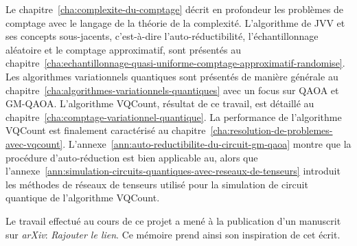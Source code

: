
Le chapitre~\ref{cha:complexite-du-comptage} décrit en profondeur les problèmes de comptage avec le langage de la théorie de la complexité. L'algorithme de JVV et ses concepts sous-jacents, c'est-à-dire l'auto-réductibilité, l'échantillonnage aléatoire et le comptage approximatif, sont présentés au chapitre~\ref{cha:echantillonnage-quasi-uniforme-comptage-approximatif-randomise}. Les algorithmes variationnels quantiques sont présentés de manière générale au chapitre~\ref{cha:algorithmes-variationnels-quantiques} avec un focus sur QAOA et GM-QAOA. L'algorithme VQCount, résultat de ce travail, est détaillé au chapitre~\ref{cha:comptage-variationnel-quantique}. La performance de l'algorithme VQCount est finalement caractérisé au chapitre~\ref{cha:resolution-de-problemes-avec-vqcount}. L'annexe~\ref{ann:auto-reductibilite-du-circuit-gm-qaoa} montre que la procédure d'auto-réduction est bien applicable au, alors que l'annexe~\ref{ann:simulation-circuits-quantiques-avec-reseaux-de-tenseurs} introduit les méthodes de réseaux de tenseurs utilisé pour la simulation de circuit quantique de l'algorithme VQCount.

Le travail effectué au cours de ce projet a mené à la publication d'un manuscrit sur \textit{arXiv}: \textcolor{mydarkred}{\textit{Rajouter le lien}}. Ce mémoire prend ainsi son inspiration de cet écrit.